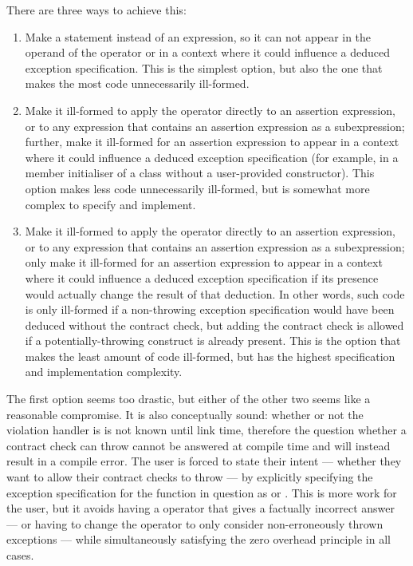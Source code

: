 There are three ways to achieve this:
\begin{enumerate}
\item Make  a statement instead of an expression, so it can not appear in the operand of the  operator or in a context where it could influence a deduced exception specification. This is the simplest option, but also the one that makes the most code unnecessarily ill-formed.
\item Make it ill-formed to apply the  operator directly to an assertion expression, or to any expression that contains an assertion expression as a subexpression; further, make it ill-formed for an assertion expression to appear in a context where it could influence a deduced exception specification (for example, in a member initialiser of a class without a user-provided constructor). This option makes less code unnecessarily ill-formed, but is somewhat more complex to specify and implement.
\item Make it ill-formed to apply the  operator directly to an assertion expression, or to any expression that contains an assertion expression as a subexpression; only make it ill-formed for an assertion expression to appear in a context where it could influence a deduced exception specification if its presence would actually change the result of that deduction. In other words, such code is only ill-formed if a non-throwing exception specification would have been deduced without the contract check, but adding the contract check is allowed if a potentially-throwing construct is already present. This is the option that makes the least amount of code ill-formed, but has the highest specification and implementation complexity.
\end{enumerate}

The first option seems too drastic, but either of the other two seems like a reasonable compromise. It is also conceptually sound: whether or not the violation handler is  is not known until link time, therefore the question whether a contract check can throw cannot be answered at compile time and will instead result in a compile error. The user is forced to state their intent --- whether they want to allow their contract checks to throw --- by explicitly specifying the exception specification for the function in question as  or . This is more work for the user, but it avoids having a  operator that gives a factually incorrect answer --- or having to change the  operator to only consider non-erroneously thrown exceptions --- while simultaneously satisfying the zero overhead principle in all cases.

